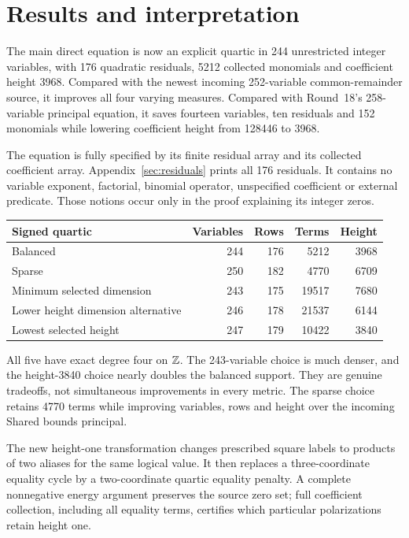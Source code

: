 \section{Results and interpretation}
\label{sec:results}
The main direct equation is now an explicit quartic in 244 unrestricted
integer variables, with 176 quadratic residuals, 5212 collected monomials
and coefficient height 3968. Compared with the newest incoming
252-variable common-remainder source, it improves all four varying
measures. Compared with Round~18's 258-variable principal equation, it
saves fourteen variables, ten residuals and 152 monomials while
lowering coefficient height from 128446 to 3968.

The equation is fully specified by its finite residual array and its
collected coefficient array. Appendix~\ref{sec:residuals} prints all 176
residuals. It contains no variable exponent, factorial, binomial operator,
unspecified coefficient or external predicate. Those notions occur only
in the proof explaining its integer zeros.

\begin{center}\small
\begin{tabular}{@{}lrrrr@{}}\toprule
Signed quartic & Variables & Rows & Terms & Height\\\midrule
Balanced &244&176&5212&3968\\
Sparse &250&182&4770&6709\\
Minimum selected dimension &243&175&19517&7680\\
Lower height dimension alternative &246&178&21537&6144\\
Lowest selected height &247&179&10422&3840\\\bottomrule
\end{tabular}
\end{center}
All five have exact degree four on $\mathbb Z$. The 243-variable choice is much
denser, and the height-3840 choice nearly doubles the balanced support.
They are genuine tradeoffs, not simultaneous improvements in every metric.
The sparse choice retains 4770 terms while improving variables, rows and
height over the incoming Shared bounds principal.

The new height-one transformation changes prescribed square labels to
products of two aliases for the same logical value. It then replaces a
three-coordinate equality cycle by a two-coordinate quartic equality
penalty. A complete nonnegative energy argument preserves the source zero
set; full coefficient collection, including all equality terms, certifies
which particular polarizations retain height one.

